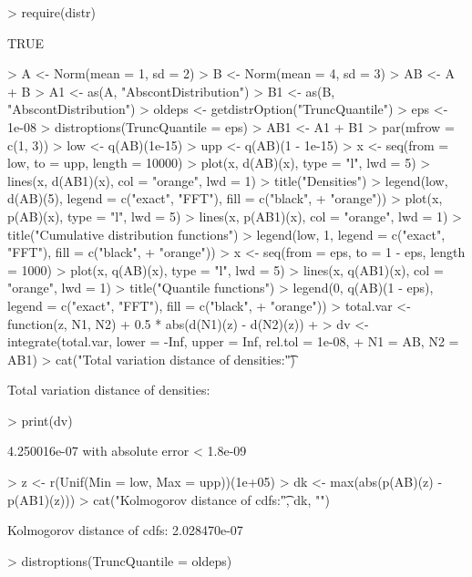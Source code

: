 \documentclass[11pt]{article}
\begin{document}
\begin{Schunk}
\begin{Sinput}
> require(distr)
\end{Sinput}
\begin{Soutput}
[1] TRUE
\end{Soutput}
\begin{Sinput}
> A <- Norm(mean = 1, sd = 2)
> B <- Norm(mean = 4, sd = 3)
> AB <- A + B
> A1 <- as(A, "AbscontDistribution")
> B1 <- as(B, "AbscontDistribution")
> oldeps <- getdistrOption("TruncQuantile")
> eps <- 1e-08
> distroptions(TruncQuantile = eps)
> AB1 <- A1 + B1
> par(mfrow = c(1, 3))
> low <- q(AB)(1e-15)
> upp <- q(AB)(1 - 1e-15)
> x <- seq(from = low, to = upp, length = 10000)
> plot(x, d(AB)(x), type = "l", lwd = 5)
> lines(x, d(AB1)(x), col = "orange", lwd = 1)
> title("Densities")
> legend(low, d(AB)(5), legend = c("exact", "FFT"), fill = c("black", 
+     "orange"))
> plot(x, p(AB)(x), type = "l", lwd = 5)
> lines(x, p(AB1)(x), col = "orange", lwd = 1)
> title("Cumulative distribution functions")
> legend(low, 1, legend = c("exact", "FFT"), fill = c("black", 
+     "orange"))
> x <- seq(from = eps, to = 1 - eps, length = 1000)
> plot(x, q(AB)(x), type = "l", lwd = 5)
> lines(x, q(AB1)(x), col = "orange", lwd = 1)
> title("Quantile functions")
> legend(0, q(AB)(1 - eps), legend = c("exact", "FFT"), fill = c("black", 
+     "orange"))
> total.var <- function(z, N1, N2) {
+     0.5 * abs(d(N1)(z) - d(N2)(z))
+ }
> dv <- integrate(total.var, lower = -Inf, upper = Inf, rel.tol = 1e-08, 
+     N1 = AB, N2 = AB1)
> cat("Total variation distance of densities:\t")
\end{Sinput}
\begin{Soutput}
Total variation distance of densities:	
\end{Soutput}
\begin{Sinput}
> print(dv)
\end{Sinput}
\begin{Soutput}
4.250016e-07 with absolute error < 1.8e-09
\end{Soutput}
\begin{Sinput}
> z <- r(Unif(Min = low, Max = upp))(1e+05)
> dk <- max(abs(p(AB)(z) - p(AB1)(z)))
> cat("Kolmogorov distance of cdfs:\t", dk, "\n")
\end{Sinput}
\begin{Soutput}
Kolmogorov distance of cdfs:	 2.028470e-07 
\end{Soutput}
\begin{Sinput}
> distroptions(TruncQuantile = oldeps)
\end{Sinput}
\end{Schunk}
\end{document}
